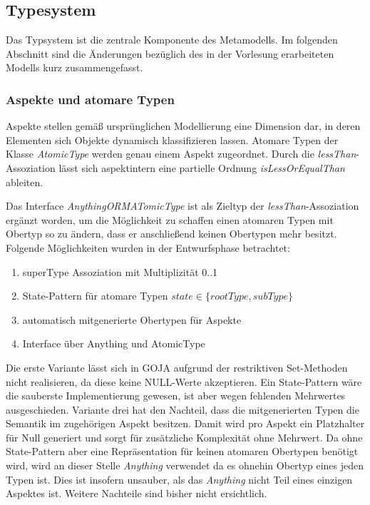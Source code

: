 \subsection{Typesystem}
Das Typsystem ist die zentrale Komponente des Metamodells. Im folgenden Abschnitt sind die 
Änderungen bezüglich des in der Vorlesung erarbeiteten Modells kurz zusammengefasst.

\subsubsection{Aspekte und atomare Typen}

Aspekte stellen gemäß ursprünglichen Modellierung eine Dimension dar, in deren Elementen sich Objekte dynamisch klassifizieren lassen. 
Atomare Typen der Klasse \emph{AtomicType} werden genau einem Aspekt zugeordnet. Durch die \emph{lessThan}-Assoziation lässt sich aspektintern eine 
partielle Ordnung \emph{isLessOrEqualThan} ableiten.  


Das Interface \emph{AnythingORMATomicType} ist als Zieltyp der \emph{lessThan}-Assoziation ergänzt worden, 
um die Möglichkeit zu schaffen einen atomaren Typen mit Obertyp so zu ändern, dass er anschließend keinen 
Obertypen mehr besitzt. Folgende Möglichkeiten wurden in der Entwurfsphase betrachtet: 
\begin{enumerate}
  		\item superType Assoziation mit Multiplizität 0..1
		\item State-Pattern für atomare Typen \(state \in \{rootType, subType\}\)
        \item automatisch mitgenerierte Obertypen für Aspekte
        \item Interface über Anything und AtomicType
\end{enumerate}

Die erste Variante lässt sich in GOJA aufgrund der restriktiven Set-Methoden nicht realisieren, da diese keine NULL-Werte akzeptieren.
Ein State-Pattern wäre die sauberste Implementierung gewesen, ist aber wegen fehlenden Mehrwertes ausgeschieden. 
Variante drei hat den Nachteil, dass die mitgenerierten Typen die Semantik  im zugehörigen Aspekt besitzen.
Damit wird pro Aspekt ein Platzhalter für Null generiert und sorgt für zusätzliche Komplexität ohne Mehrwert. 
Da ohne State-Pattern aber eine Repräsentation für keinen atomaren Obertypen benötigt wird, wird an dieser Stelle \emph{Anything} verwendet 
da es ohnehin Obertyp eines jeden Typen ist. Dies ist insofern unsauber, als das \emph{Anything} nicht Teil eines einzigen Aspektes ist.
Weitere Nachteile sind bisher nicht ersichtlich.


